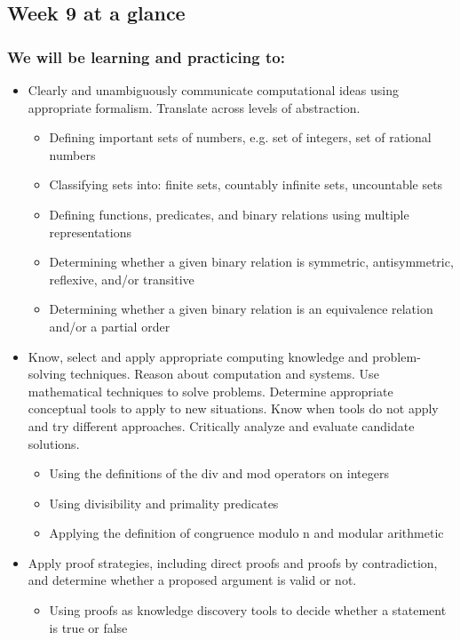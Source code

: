 \documentclass[12pt, oneside]{article}
\begin{document}
\begin{flushright}
\end{flushright} 
\subsection*{Week 9 at a glance}

\subsubsection*{We will be learning and practicing to:}
\begin{itemize}

\item Clearly and unambiguously communicate computational ideas using appropriate formalism. Translate across levels of abstraction.
\begin{itemize}
    \item Defining important sets of numbers, e.g. set of integers, set of rational numbers
    \item Classifying sets into: finite sets, countably infinite sets, uncountable sets
    \item Defining functions, predicates, and binary relations using multiple representations
    \item Determining whether a given binary relation is symmetric, antisymmetric, reflexive, and/or transitive
    \item Determining whether a given binary relation is an equivalence relation and/or a partial order
\end{itemize}

\item Know, select and apply appropriate computing knowledge and problem-solving techniques. Reason about computation and systems. Use mathematical techniques to solve problems. Determine appropriate conceptual tools to apply to new situations. Know when tools do not apply and try different approaches. Critically analyze and evaluate candidate solutions.
\begin{itemize}
    \item Using the definitions of the div and mod operators on integers
    \item Using divisibility and primality predicates
    \item Applying the definition of congruence modulo n and modular arithmetic
\end{itemize}

\item Apply proof strategies, including direct proofs and proofs by contradiction, and determine whether a proposed argument is valid or not.
\begin{itemize}
    \item Using proofs as knowledge discovery tools to decide whether a statement is true or false
\end{itemize}
\end{itemize}
\end{document}
